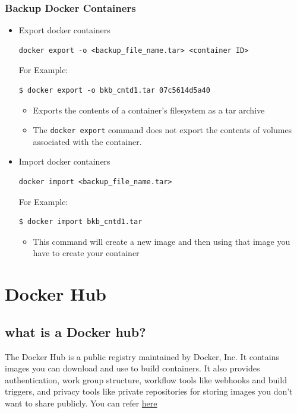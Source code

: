 \documentclass[11pt]{article}
\begin{document}
\subsubsection{Backup Docker Containers}
\label{sec:orgheadline35}
\begin{itemize}
\item Export docker containers
\begin{verbatim}
docker export -o <backup_file_name.tar> <container ID>
\end{verbatim}
For Example:
\begin{verbatim}
$ docker export -o bkb_cntd1.tar 07c5614d5a40
\end{verbatim}
\begin{itemize}
\item Exports the contents of a container's filesystem as a tar archive
\item The \texttt{docker export} command does not export the contents of volumes
associated with the container.
\end{itemize}

\item Import docker containers
\begin{verbatim}
docker import <backup_file_name.tar>
\end{verbatim}
For Example:
\begin{verbatim}
$ docker import bkb_cntd1.tar
\end{verbatim}
\begin{itemize}
\item This command will create a new image and then using that image you have
to create your container
\end{itemize}
\end{itemize}

\section{Docker Hub}
\label{sec:orgheadline44}
\subsection{what is a Docker hub?}
\label{sec:orgheadline38}
The Docker Hub is a public registry maintained by Docker, Inc. It contains
images you can download and use to build containers. It also provides
authentication, work group structure, workflow tools like webhooks and build
triggers, and privacy tools like private repositories for storing images you
don't want to share publicly.
You can refer \href{https://docs.docker.com/docker-hub/}{here}
\end{document}
